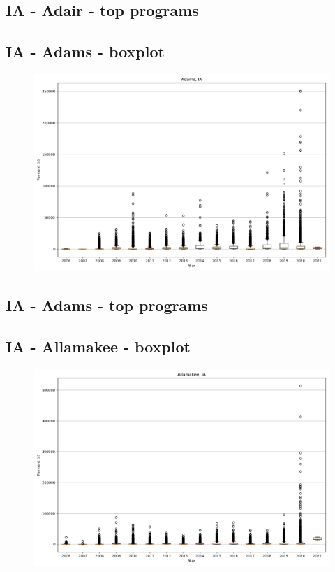 \subsection*{IA - Adair - top programs}

\newpage
\subsection*{IA - Adams - boxplot}
\begin{figure}[h]
\centering
\includegraphics[width=7in]{../output/boxplots/counties/Adams-IA_boxplot.png}
\end{figure}


\subsection*{IA - Adams - top programs}

\newpage
\subsection*{IA - Allamakee - boxplot}
\begin{figure}[h]
\centering
\includegraphics[width=7in]{../output/boxplots/counties/Allamakee-IA_boxplot.png}
\end{figure}


